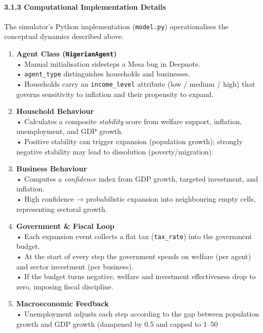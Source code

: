 \documentclass[
]{article}
\begin{document}
\paragraph{3.1.3 Computational Implementation
Details}\label{computational-implementation-details}

The simulator's Python implementation (\texttt{model.py})
operationalises the conceptual dynamics described above.

\begin{enumerate}
\def\labelenumi{\arabic{enumi}.}
\item
  \textbf{Agent Class (\texttt{NigerianAgent})}\\
  • Manual initialisation sidesteps a Mesa bug in Deepnote.\\
  • \texttt{agent\_type} distinguishes households and businesses.\\
  • Households carry an \texttt{income\_level} attribute (low / medium /
  high) that governs sensitivity to inflation and their propensity to
  expand.
\item
  \textbf{Household Behaviour}\\
  • Calculates a composite \emph{stability} score from welfare support,
  inflation, unemployment, and GDP growth.\\
  • Positive stability can trigger expansion (population growth);
  strongly negative stability may lead to dissolution
  (poverty/migration).
\item
  \textbf{Business Behaviour}\\
  • Computes a \emph{confidence} index from GDP growth, targeted
  investment, and inflation.\\
  • High confidence → probabilistic expansion into neighbouring empty
  cells, representing sectoral growth.
\item
  \textbf{Government \& Fiscal Loop}\\
  • Each expansion event collects a flat tax (\texttt{tax\_rate}) into
  the government budget.\\
  • At the start of every step the government spends on welfare (per
  agent) and sector investment (per business).\\
  • If the budget turns negative, welfare and investment effectiveness
  drop to zero, imposing fiscal discipline.
\item
  \textbf{Macroeconomic Feedback}\\
  • Unemployment adjusts each step according to the gap between
  population growth and GDP growth (dampened by 0.5 and capped to 1--50

\end{enumerate}
\end{document}
